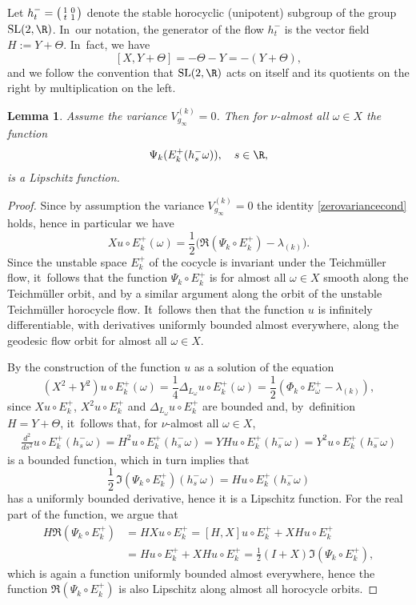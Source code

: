 \documentclass[10pt]{amsart}
\newenvironment{smallpmatrix}{\big(\begin{smallmatrix}}{\end{smallmatrix}\big)}
\theoremstyle{plain}
\newtheorem{lemma}[thm]{Lemma}
\theoremstyle{definition}
\numberwithin{equation}{subsection}
\newcommand{\SL}{\mathrm{SL}}
\let\laplacian\Delta
\begin{document}
Let $h^-_t =
\begin{smallpmatrix} 1 & 0 \\ t & 1 \end{smallpmatrix}$ denote the stable horocyclic (unipotent) subgroup of the group $\SL(2,\R)$. In~our notation, the generator of the flow $h^-_t$ is the vector field $H:=Y+ \Theta$. In~fact, we have
\[
[X, Y+\Theta] =- \Theta -Y = -(Y+\Theta),
\]
and we follow the convention that $\SL(2,\R)$ acts on itself and its quotients on the right by multiplication on the left.

\begin{lemma}
\label{lemma:Lipschitz} Assume the variance $V^{(k)}_{g_\infty} =0$. Then for $\nu$-almost all $\omega \in X$ the function
\[
\Psi_k (E^+_k(h^-_s \omega)), \quad s \in \R,
\]
is a Lipschitz function.
\end{lemma}
\begin{proof}
Since by assumption the variance $V^{(k)}_{g_\infty} =0$ the identity \eqref{zerovariancecond} holds, hence in particular we have
\[
X u \circ E^+_k(\omega) = \frac{1}{2} \bigl(\Re (\Psi_k \circ E^+_k) -\lambda_{(k)} \bigr).
\]
Since the unstable space $E^+_k$ of the cocycle is invariant under the Teichmüller flow, it~follows that the function $\Psi_k \circ E^+_k$ is
for almost all $\omega \in X$ smooth along the Teichmüller orbit, and
by a similar argument along the orbit of the unstable Teichmüller horocycle flow. It~follows then that the function $u$ is infinitely differentiable, with derivatives uniformly bounded almost everywhere, along
the geodesic flow orbit for almost all $\omega\in X$.

By the construction of the function $u$ as a solution of the equation
\[
\left(X^2 + Y^2 \right) u \circ E^+_k(\omega) = \frac{1}{4}\laplacian_{L_\omega} u \circ E^+_k(\omega) = \frac{1}{2} (\Phi_k\circ E^+_\omega -\lambda_{(k)}),
\]
since $Xu\circ E^+_k$, $X^2 u \circ E^+_k$ and $\laplacian_{L_\omega} u \circ E^+_k$ are bounded and, by~definition $H= Y+\Theta$, it~follows that, for $\nu$-almost all
$\omega \in X$,
\begin{align*}
\frac{d^2}{ds^2} u \circ E^+_k (h_s^{-} \omega)= H^2 u \circ E^+_k (h^-_s\omega) = YH u \circ E^+_k (h^-_s\omega) =Y^2 u \circ E^+_k (h^-_s\omega)
\end{align*}
is a bounded function, which in turn implies
that
\[
\frac{1}{2}\,\Im (\Psi_k \circ E^+_k) (h^-_s \omega) = Hu \circ E^+_k(h^-_s \omega)
\]
has a uniformly bounded derivative, hence it is a Lipschitz function. For the
real part of the function, we argue that
\[
\begin{aligned}
H \Re(\Psi_k \circ E^+_k) &= H X u \circ E^+_k = [H,X] u \circ E^+_k + XH u \circ E^+_k \\ & = H u\circ E^+_k + X Hu\circ E^+_k =
\frac{1}{2} (I+ X)\Im(\Psi_k \circ E^+_k),
\end{aligned}
\]
which is again a function uniformly bounded almost everywhere, hence the function
$\Re(\Psi_k \circ E^+_k)$ is also Lipschitz
along almost all horocycle orbits.
\end{proof}
\end{document}
